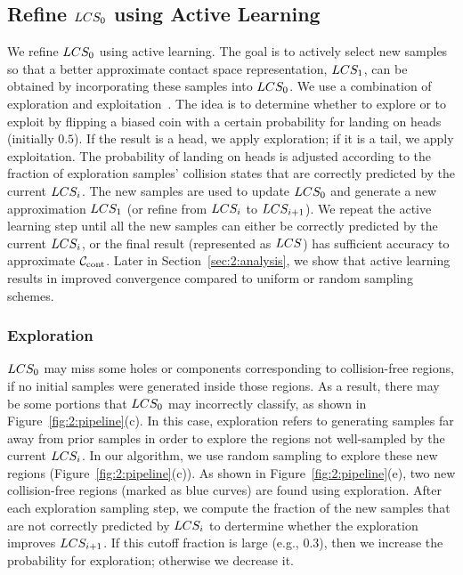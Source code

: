 \subsection{Refine $LCS_0$ using Active Learning}
\label{sec:2:offline:activelearning}
We refine $LCS_0$ using active learning. The
goal is to actively select new samples so that a better
approximate contact space representation, $LCS_1$, can be obtained by incorporating
these samples into $LCS_0$. We use a
combination of exploration and exploitation~\cite{Huang:2010:ALQ}.
The idea is to determine whether to explore
or to exploit by flipping a biased coin with a certain probability for landing on heads
(initially $0.5$). If the result is a head, we apply exploration;
if it is a tail, we apply exploitation. The probability of landing on heads is adjusted
according to the fraction of exploration samples' collision
states that are correctly predicted by the current $LCS_i$. The new
samples are used to update $LCS_0$ and generate a new approximation
$LCS_1$ (or refine from $LCS_i$ to $LCS_{i+1}$). We repeat the active
learning step until all the new samples can either be correctly
predicted by the current $LCS_i$, or the final result (represented
as $LCS$) has sufficient accuracy to approximate $\mathcal C_\text{cont}$. Later in Section~\ref{sec:2:analysis}, we show that active learning results in improved convergence compared to uniform or random sampling schemes.


\subsubsection{Exploration}
$LCS_0$ may miss some holes or components corresponding to collision-free regions, if no initial samples were generated inside those regions. As a result, there may be some portions that $LCS_0$ may incorrectly classify, as shown in Figure~\ref{fig:2:pipeline}(c). In this case,
exploration refers to generating samples far away from prior
samples in order to explore the regions not well-sampled by the
current $LCS_i$. In our algorithm, we use random sampling to
explore these new regions (Figure~\ref{fig:2:pipeline}(c)). As
shown in Figure~\ref{fig:2:pipeline}(e), two new collision-free
regions (marked as blue curves) are found using exploration. After
each exploration sampling step, we compute the fraction of the new
samples that are not correctly predicted by $LCS_i$ to dertermine whether the exploration improves $LCS_{i+1}$.
If this cutoff fraction is large (e.g., $0.3$), then we increase the probability for exploration; otherwise we
decrease it.


